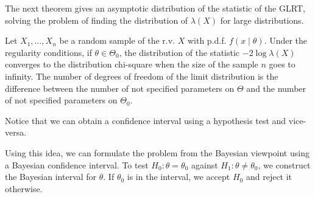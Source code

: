 \documentclass[12pt,a4paper]{report}
\begin{document}
The next theorem gives an asymptotic distribution of the statistic of the GLRT, solving the problem of finding the distribution of $\lambda(X)$ for large distributions. 

\begin{theorem}
    Let $X_1, \ldots, X_n$ be a random sample of the r.v. $X$ with p.d.f. $f(x \mid \theta)$. Under the regularity conditions, if $\theta \in \Theta_0$, the distribution of the statistic $- 2 \log \lambda(X)$ converges to the distribution chi-square when the size of the sample $n$ goes to infinity. The number of degrees of freedom of the limit distribution is the difference between the number of not specified parameters on $\Theta$ and the number of not specified parameters on $\Theta_0$.
\end{theorem}

Notice that we can obtain a confidence interval using a hypothesis test and vice-versa. 

Using this idea, we can formulate the problem from the Bayesian viewpoint using a Bayesian confidence interval. To test $H_0 : \theta = \theta_0$ against $H_1 : \theta \neq \theta_0$, we construct the Bayesian interval for $\theta$. If $\theta_0$ is in the interval, we accept $H_0$ and reject it otherwise. 

\nocite{*}


\end{document}
